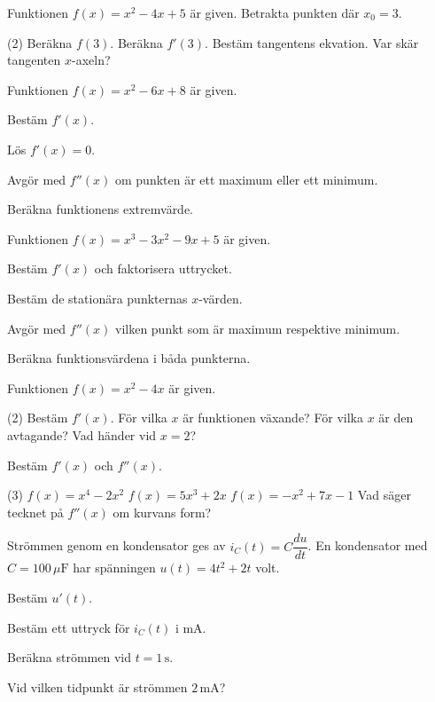 Funktionen $f(x) = x^2 - 4x + 5$ är given. Betrakta punkten där $x_0 = 3$.
\begin{delar}(2)
  \task Beräkna $f(3)$.
  \task Beräkna $f'(3)$.
  \task Bestäm tangentens ekvation.
  \task Var skär tangenten $x$-axeln?
\end{delar}

Funktionen $f(x) = x^2 - 6x + 8$ är given.
\begin{parts}
  \item Bestäm $f'(x)$.
  \item Lös $f'(x) = 0$.
  \item Avgör med $f''(x)$ om punkten är ett maximum eller ett minimum.
  \item Beräkna funktionens extremvärde.
\end{parts}

Funktionen $f(x) = x^3 - 3x^2 - 9x + 5$ är given.
\begin{parts}
  \item Bestäm $f'(x)$ och faktorisera uttrycket.
  \item Bestäm de stationära punkternas $x$-värden.
  \item Avgör med $f''(x)$ vilken punkt som är maximum respektive minimum.
  \item Beräkna funktionsvärdena i båda punkterna.
\end{parts}

Funktionen $f(x) = x^2 - 4x$ är given.
\begin{delar}(2)
  \task Bestäm $f'(x)$.
  \task För vilka $x$ är funktionen växande?
  \task För vilka $x$ är den avtagande?
  \task Vad händer vid $x = 2$?
\end{delar}

Bestäm $f'(x)$ och $f''(x)$.
\begin{delar}(3)
  \task $f(x) = x^4 - 2x^2$
  \task $f(x) = 5x^3 + 2x$
  \task $f(x) = -x^2 + 7x - 1$
  \task* Vad säger tecknet på $f''(x)$ om kurvans form?
\end{delar}

Strömmen genom en kondensator ges av $i_C(t) = C\dfrac{du}{dt}$. En kondensator med
$C = 100\,\mu\text{F}$ har spänningen $u(t) = 4t^2 + 2t$ volt.
\begin{parts}
  \item Bestäm $u'(t)$.
  \item Bestäm ett uttryck för $i_C(t)$ i mA.
  \item Beräkna strömmen vid $t = 1\,\text{s}$.
  \item Vid vilken tidpunkt är strömmen $2\,\text{mA}$?
\end{parts}

